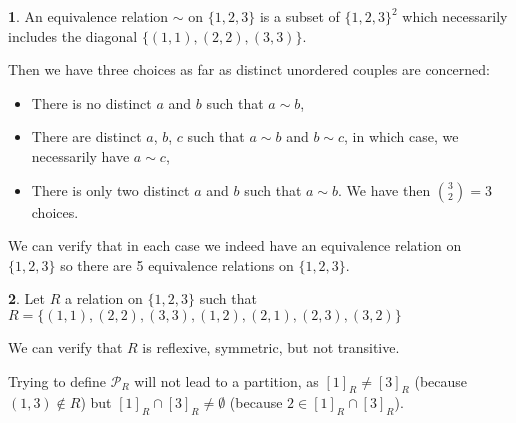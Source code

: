 \documentclass[11pt]{article}
\theoremstyle{definition}
\newtheorem{exo}{}[subsection]
\theoremstyle{remark}
\begin{document}
\begin{exo}
	An equivalence relation $\sim$ on $\{1,2,3\}$ is a subset of $\{1,2,3\}^2$ which necessarily includes the diagonal $\{(1,1),(2,2),(3,3)\}$.

	Then we have three choices as far as distinct unordered couples are concerned:
	\begin{itemize}
		\item There is no distinct $a$ and $b$ such that $a\sim b$,
		\item There are distinct $a$, $b$, $c$ such that $a\sim b$ and $b\sim c$, in which case, we necessarily have $a\sim c$,
		\item There is only two distinct $a$ and $b$ such that $a\sim b$. We have then ${3\choose2}=3$ choices.
	\end{itemize}

	We can verify that in each case we indeed have an equivalence relation on $\{1,2,3\}$ so there are 5 equivalence relations on $\{1,2,3\}$.
\end{exo}

\begin{exo}
	Let $R$ a relation on $\{1,2,3\}$ such that $R=\{(1,1),(2,2),(3,3),(1,2),(2,1),(2,3),(3,2)\}$

	We can verify that $R$ is reflexive, symmetric, but not transitive.

	Trying to define $\mathcal P_R$ will not lead to a partition, as $[1]_R\neq[3]_R$ (because $(1,3)\notin R$) but $[1]_R\cap[3]_R\neq\emptyset$ (because $2\in[1]_R\cap[3]_R$).
\end{exo}
\end{document}
